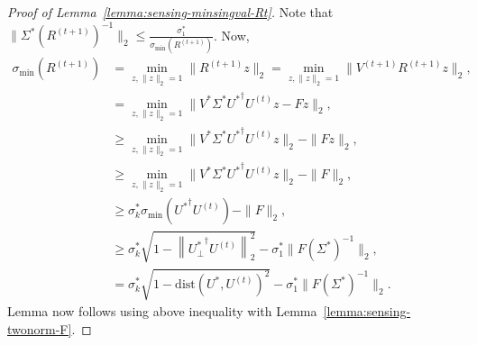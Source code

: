 \documentclass[11pt]{article}
\theoremstyle{plain}
\theoremstyle{definition}
\newcommand{\dist}{\mathrm{dist}}
\newcommand{\twonorm}[1]{\left\| {#1} \right\|_2}
\begin{document}
\begin{proof}[Proof of Lemma~\ref{lemma:sensing-minsingval-Rt}]
Note that $\|\Sigma^*(R^{(t+1)})^{-1}\|_2\leq \frac{\sigma^*_1}{\sigma_{\text{min}}(R^{(t+1)})}$. Now,
\begin{align}
  \sigma_{\text{min}}(R^{(t+1)})&=\min_{z, \|z\|_2=1}\|R^{(t+1)}z\|_2=\min_{z, \|z\|_2=1}\|V^{(t+1)}R^{(t+1)}z\|_2,\nonumber\\
&=\min_{z, \|z\|_2=1}\|V^*\Sigma^*{U^*}^\dag  U^{(t)}z-Fz\|_2, \nonumber\\
&\geq \min_{z, \|z\|_2=1}\|V^*\Sigma^*{U^*}^\dag  U^{(t)}z\|_2-\|Fz\|_2,\nonumber\\
&\geq \min_{z, \|z\|_2=1}\|V^*\Sigma^*{U^*}^\dag  U^{(t)}z\|_2-\|F\|_2,\nonumber\\
&\geq \sigma_{k}^*\sigma_{\text{min}}({U^*}^\dag  U^{(t)})-\|F\|_2,\nonumber\\
&\geq \sigma_{k}^*\sqrt{1-\twonorm{{U_{\perp}^*}^\dag U^{(t)}}^2}-\sigma^*_{1}\|F(\Sigma^*)^{-1}\|_2,\nonumber\\
&=\sigma_{k}^*\sqrt{1-\dist(U^*, U^{(t)})^2}-\sigma^*_{1}\|F(\Sigma^*)^{-1}\|_2. 
\end{align}
Lemma now follows using above inequality with Lemma~\ref{lemma:sensing-twonorm-F}. 


\end{proof}
\end{document}
